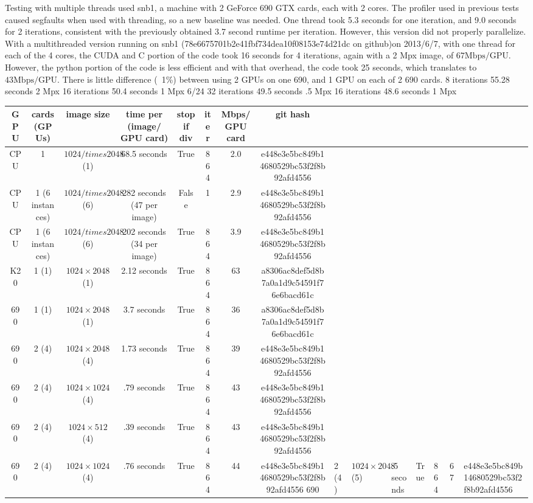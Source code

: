 \documentclass{article}
\begin{document}
	Testing with multiple threads used snb1, a machine with 2 GeForce 690 GTX cards, each with 2 cores. The profiler used in previous tests caused segfaults when used with threading, so a new baseline was needed.  One thread took 5.3 seconds for one iteration, and 9.0 seconds for 2 iterations, consistent with the previously obtained 3.7 second runtime per iteration.  However, this version did not properly parallelize.
	With a multithreaded version running on snb1 (78e6675701b2e41fbf734dea10f08153e74d21dc on github)on 2013/6/7, with one thread for each of the 4 cores, the CUDA and C portion of the code took 16 seconds for 4 iterations, again with a 2 Mpx image, of $67 \mathrm{Mbps/GPU}$.  However, the python portion of the code is less efficient and with that overhead, the code took 25 seconds, which translates to $43 \mathrm{Mbps/GPU}$.  There is little difference (~1\%) between using 2 GPUs on one 690, and 1 GPU on each of 2 690 cards.
	8 iterations 55.28 seconds 2 Mpx
	16 iterations 50.4 seconds 1 Mpx
	6/24
	32 iterations 49.5 seconds .5 Mpx
	16 iterations 48.6 seconds 1 Mpx
	
	\begin{tabular}{c|c|c|c|c|c|c|c}
	GPU & cards (GPUs) & image size & time per (image/ GPU card) & stop if div & iter & Mbps/GPU card & git hash \\
	\hline
	CPU & 1	& $1024 /times 2048$ (1)& 68.5 seconds & True & 864 & 2.0 & e448e3e5bc849b14680529bc53f2f8b92afd4556\\
	CPU & 1 (6 instances) & $1024 /times 2048$ (6)& 282 seconds (47 per image) & False & 1 & 2.9 & e448e3e5bc849b14680529bc53f2f8b92afd4556\\
	
	CPU & 1 (6 instances) & $1024 /times 2048$ (6)& 202 seconds (34 per image) & True & 864 & 3.9 & e448e3e5bc849b14680529bc53f2f8b92afd4556\\
	K20 & 1 (1) & $1024 \times 2048$ (1)& 2.12 seconds & True & 864 &  63 & a8306ac8def5d8b7a0a1d9c54591f76e6bacd61c \\
	690 & 1 (1) & $1024 \times 2048$ (1)& 3.7 seconds & True & 864 &  36 & a8306ac8def5d8b7a0a1d9c54591f76e6bacd61c \\
	690 & 2 (4) & $1024 \times 2048$ (4) & 1.73 seconds & True & 864 & 39 & e448e3e5bc849b14680529bc53f2f8b92afd4556 \\
	690 & 2 (4) & $1024 \times 1024$ (4)& .79 seconds & True & 864 & 43 & e448e3e5bc849b14680529bc53f2f8b92afd4556 \\
	690 & 2 (4) & $1024 \times 512$ (4)& .39 seconds & True & 864 & 43 & e448e3e5bc849b14680529bc53f2f8b92afd4556 \\
	690 & 2 (4) & $1024 \times 1024$ (4)& .76 seconds & True & 864 & 44 & e448e3e5bc849b14680529bc53f2f8b92afd4556
	690 & 2 (4) & $1024 \times 2048$ (5)& .5 seconds & True & 864 & 67 & e448e3e5bc849b14680529bc53f2f8b92afd4556
	\end{tabular}
\end{document}
